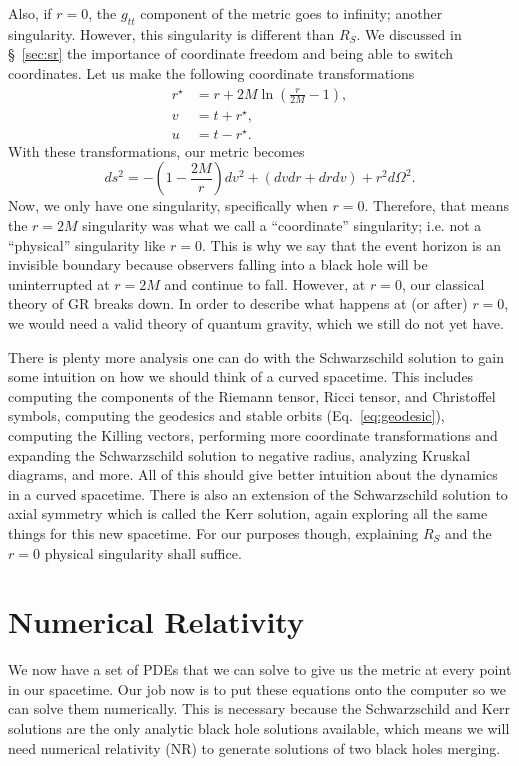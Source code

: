 \begin{bibunit}[unsrtnat]
Also, if $r=0$, the $g_{tt}$ component of the metric goes to infinity; another
singularity. However, this singularity is different than $R_S$. We discussed in
\S~\ref{sec:sr} the importance of coordinate freedom and being able to switch
coordinates. Let us make the following coordinate transformations
\begin{align}
   r^\star &= r + 2M\ln\left(\frac{r}{2M}-1\right), \\
   v &= t + r^\star, \\
   u &= t - r^\star.
\end{align}
With these transformations, our metric becomes
\begin{equation}
   ds^2 = -\left(1-\frac{2M}{r}\right)dv^2 + (dvdr+drdv) + r^2d\Omega^2.
\end{equation}
Now, we only have one singularity, specifically when $r=0$. Therefore, that
means the $r=2M$ singularity was what we call a ``coordinate'' singularity; i.e.
not a ``physical'' singularity like $r=0$. This is why we say that the event
horizon is an invisible boundary because observers falling into a black hole
will be uninterrupted at $r=2M$ and continue to fall. However, at $r=0$, our
classical theory of GR breaks down. In order to describe what happens at (or
after) $r=0$, we would need a valid theory of quantum gravity, which we still do
not yet have.

There is plenty more analysis one can do with the Schwarzschild solution to gain
some intuition on how we should think of a curved spacetime. This includes
computing the components of the Riemann tensor, Ricci tensor, and Christoffel
symbols, computing the geodesics and stable orbits (Eq.~\ref{eq:geodesic}),
computing the Killing vectors, performing more coordinate transformations and
expanding the Schwarzschild solution to negative radius, analyzing Kruskal
diagrams, and more. All of this should give better intuition about the dynamics
in a curved spacetime. There is also an extension of the Schwarzschild solution to
axial symmetry which is called the Kerr solution, again exploring all the same
things for this new spacetime. For our purposes though, explaining $R_S$ and the
$r=0$ physical singularity shall suffice.

\section{Numerical Relativity}

We now have a set of PDEs that we can solve to give us the metric at every point
in our spacetime. Our job now is to put these equations onto the computer so we
can solve them numerically. This is necessary because the Schwarzschild and Kerr
solutions are the only analytic black hole solutions available, which means we
will need numerical relativity (NR) to generate solutions of two black holes
merging.


\end{bibunit}
